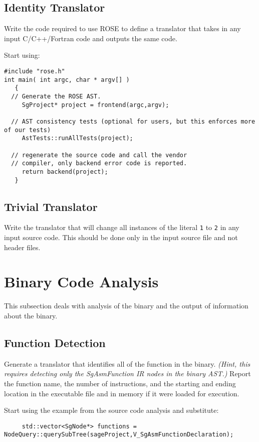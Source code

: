 \subsection{Identity Translator}
   Write the code required to use ROSE to define a translator
that takes in any input C/C++/Fortran code and outputs the 
same code.

Start using:
\begin{verbatim}
#include "rose.h"
int main( int argc, char * argv[] )
   {
  // Generate the ROSE AST.
     SgProject* project = frontend(argc,argv);

  // AST consistency tests (optional for users, but this enforces more of our tests)
     AstTests::runAllTests(project);

  // regenerate the source code and call the vendor 
  // compiler, only backend error code is reported.
     return backend(project);
   }
\end{verbatim}

\subsection{Trivial Translator}
   Write the translator that will change all instances of the literal
{\tt 1} to {\tt 2} in any input source code.  This should be done only
in the input source file and not header files.




\section{Binary Code Analysis}
   This subsection deals with analysis of the binary and the
output of information about the binary.

\subsection{Function Detection}
   Generate a translator that identifies all of the function in the binary.
{\em (Hint, this requires detecting only the SgAsmFunction IR nodes in the binary AST.)}
Report the function name, the number of instructions, and the starting and ending location
in the executable file and in memory if it were loaded for execution.

Start using the example from the source code analysis and substitute:
\begin{verbatim}
     std::vector<SgNode*> functions = NodeQuery::querySubTree(sageProject,V_SgAsmFunctionDeclaration);
\end{verbatim}



